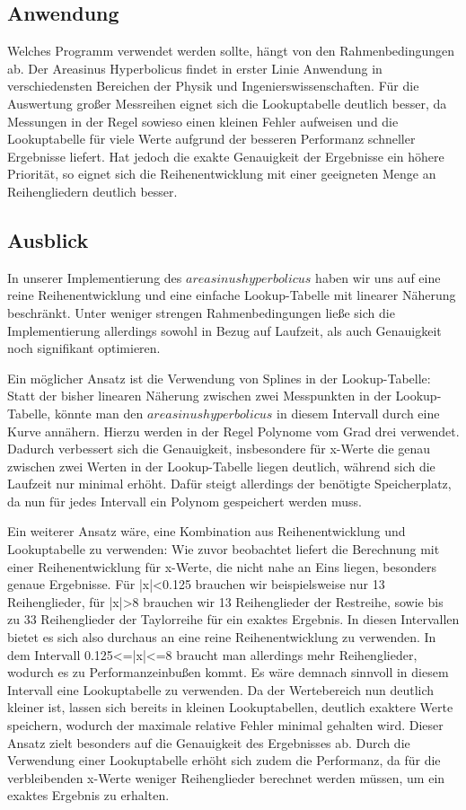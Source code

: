 \documentclass[course=erap] {aspdoc}
\begin{document}
    
    \subsection{Anwendung}
    Welches Programm verwendet werden sollte, hängt von den Rahmenbedingungen ab.
    Der Areasinus Hyperbolicus findet in erster Linie Anwendung in verschiedensten Bereichen der Physik und Ingenierswissenschaften.
    Für die Auswertung großer Messreihen eignet sich die Lookuptabelle deutlich besser, da Messungen in der Regel sowieso einen kleinen Fehler aufweisen und die Lookuptabelle für viele Werte aufgrund der besseren Performanz schneller Ergebnisse liefert.
    Hat jedoch die exakte Genauigkeit der Ergebnisse ein höhere Priorität, so eignet sich die Reihenentwicklung mit einer geeigneten Menge an Reihengliedern deutlich besser.

    \subsection{Ausblick}

    In unserer Implementierung des $areasinus hyperbolicus$ haben wir uns auf eine reine Reihenentwicklung und eine einfache Lookup-Tabelle mit linearer Näherung beschränkt.
    Unter weniger strengen Rahmenbedingungen ließe sich die Implementierung allerdings sowohl in Bezug auf Laufzeit, als auch Genauigkeit noch signifikant optimieren. 
    
    Ein möglicher Ansatz ist die Verwendung von Splines in der Lookup-Tabelle: Statt der bisher linearen Näherung zwischen zwei Messpunkten in der Lookup-Tabelle, könnte man den $areasinus hyperbolicus$ in diesem Intervall durch eine Kurve annähern.
    Hierzu werden in der Regel Polynome vom Grad drei verwendet.
    Dadurch verbessert sich die Genauigkeit, insbesondere für x-Werte die genau zwischen zwei Werten in der Lookup-Tabelle liegen deutlich, während sich die Laufzeit nur minimal erhöht.
    Dafür steigt allerdings der benötigte Speicherplatz, da nun für jedes Intervall ein Polynom gespeichert werden muss.

     Ein weiterer Ansatz wäre, eine Kombination aus Reihenentwicklung und Lookuptabelle zu verwenden: 
    Wie zuvor beobachtet liefert die Berechnung mit einer Reihenentwicklung für x-Werte, die nicht nahe an Eins liegen, besonders genaue Ergebnisse. Für |x|<0.125 brauchen wir beispielsweise nur 13 Reihenglieder, für |x|>8 brauchen wir 13 Reihenglieder der Restreihe, sowie bis zu 33 Reihenglieder der Taylorreihe für ein exaktes Ergebnis. In diesen Intervallen bietet es sich also durchaus an eine reine Reihenentwicklung zu verwenden. In dem Intervall 0.125<=|x|<=8 braucht man allerdings mehr Reihenglieder, wodurch es zu Performanzeinbußen kommt. Es wäre demnach sinnvoll in diesem Intervall eine Lookuptabelle zu verwenden. Da der Wertebereich nun deutlich kleiner ist, lassen sich bereits in kleinen Lookuptabellen, deutlich exaktere Werte speichern, wodurch der maximale relative Fehler minimal gehalten wird. Dieser Ansatz zielt besonders auf die Genauigkeit des Ergebnisses ab. Durch die Verwendung einer Lookuptabelle erhöht sich zudem die Performanz, da für die verbleibenden x-Werte weniger Reihenglieder berechnet werden müssen, um ein exaktes Ergebnis zu erhalten. 
\end{document}
